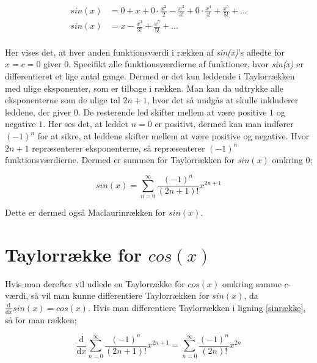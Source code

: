 \documentclass[10pt,a4paper]{book}
\begin{document}
\begin{align*}
sin(x) &= 0+x+0 \cdot \frac{x^2}{2}-\frac{x^3}{3!}+0 \cdot \frac{x^4}{4!}+\frac{x^5}{5!}+... \\
sin(x) &= x-\frac{x^3}{3!}+\frac{x^5}{5!}+... \\
\end{align*}

Her vises det, at hver anden funktionsværdi i rækken af \textit{sin(x)}'s afledte for $x=c=0$ giver $0$. Specifikt alle funktionsværdierne af funktioner, hvor \textit{sin(x)} er differentieret et lige antal gange. Dermed er det kun leddende i Taylorrækken med ulige eksponenter, som er tilbage i rækken. Man kan da udtrykke alle eksponenterne som de ulige tal $2n+1$, hvor det så undgås at skulle inkluderer leddene, der giver $0$. De resterende led skifter mellem at være positive $1$ og negative $1$. Her ses det, at leddet $n=0$ er positivt, dermed kan man indfører $(-1)^n$ for at sikre, at leddene skifter mellem at være positive og negative. Hvor $2n+1$ repræsenterer eksponenterne, så repræsenterer $(-1)^n$ funktionsværdierne. Dermed er summen for Taylorrækken for $sin(x)$ omkring $0$;

\begin{equation}\label{sinrække}
sin(x)=\sum_{n=0}^{\infty} \frac{(-1)^n}{(2n+1)!}x^{2n+1}
\end{equation}

Dette er dermed også Maclaurinrækken for $sin(x)$.




\section{Taylorrække for $cos(x)$}

Hvis man derefter vil udlede en Taylorrække for $cos(x)$ omkring samme $c$-værdi, så vil man kunne differentiere Taylorrækken for $sin(x)$, da $\frac{\mathrm{d}}{\mathrm{d}x}sin(x)=cos(x)$. Hvis man differentiere Taylorrækken i ligning \ref{sinrække}, så for man rækken;


\[
\frac{\mathrm{d}}{\mathrm{d}x} \sum_{n=0}^{\infty} \frac{(-1)^n}{(2n+1)!}x^{2n+1}
=
\sum_{n=0}^{\infty} \frac{(-1)^n}{(2n)!}x^{2n}
\]
\end{document}
